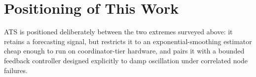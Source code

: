 \section{Positioning of This Work}

ATS is positioned deliberately between the two extremes surveyed above: it
retains a forecasting signal, but restricts it to an exponential-smoothing
estimator cheap enough to run on coordinator-tier hardware, and pairs it
with a bounded feedback controller designed explicitly to damp oscillation
under correlated node failures.
